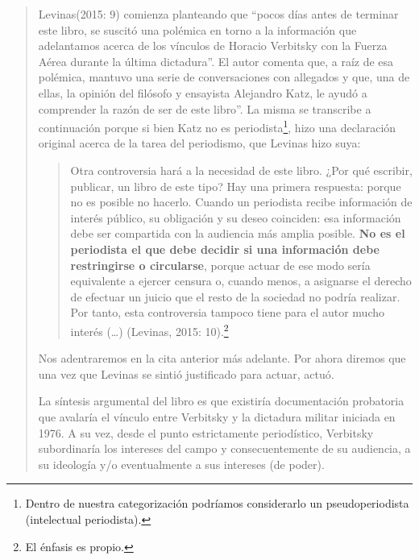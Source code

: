 \begin{quote}
Levinas(2015: 9) comienza planteando que \enquote{pocos días antes de terminar este libro, se suscitó una polémica en torno a la información que adelantamos acerca de los vínculos de Horacio Verbitsky con la Fuerza Aérea durante la última dictadura}. El autor comenta que, a raíz de esa polémica, mantuvo una serie de conversaciones con allegados y que, una de ellas, la opinión del filósofo y ensayista Alejandro Katz, le ayudó a comprender la razón de ser de este libro''. La misma se transcribe a continuación porque si bien Katz no es periodista\footnote{Dentro de nuestra categorización podríamos considerarlo un pseudoperiodista (intelectual periodista).}, hizo una declaración original acerca de la tarea del periodismo, que Levinas hizo suya:

\begin{quote}
	Otra controversia hará a la necesidad de este libro. ¿Por qué escribir, publicar, un libro de este tipo? Hay una primera respuesta: porque no es posible no hacerlo. Cuando un periodista recibe información de interés público, su obligación y su deseo coinciden: esa información debe ser compartida con la audiencia más amplia posible. \textbf{No es el periodista el que debe decidir si una información debe restringirse o circularse}, porque actuar de ese modo sería equivalente a ejercer censura o, cuando menos, a asignarse el derecho de efectuar un juicio que el resto de la sociedad no podría realizar. Por tanto, esta controversia tampoco tiene para el autor mucho interés (\dots) (Levinas, 2015: 10).\footnote{El énfasis es propio.}

\end{quote}

Nos adentraremos en la cita anterior más adelante. Por ahora diremos que una vez que Levinas se sintió justificado para actuar, actuó.

La síntesis argumental del libro es que existiría documentación probatoria que avalaría el vínculo entre Verbitsky y la dictadura militar iniciada en 1976. A su vez, desde el punto estrictamente periodístico, Verbitsky subordinaría los intereses del campo y consecuentemente de su audiencia, a su ideología y/o eventualmente a sus intereses (de poder).


\end{quote}
